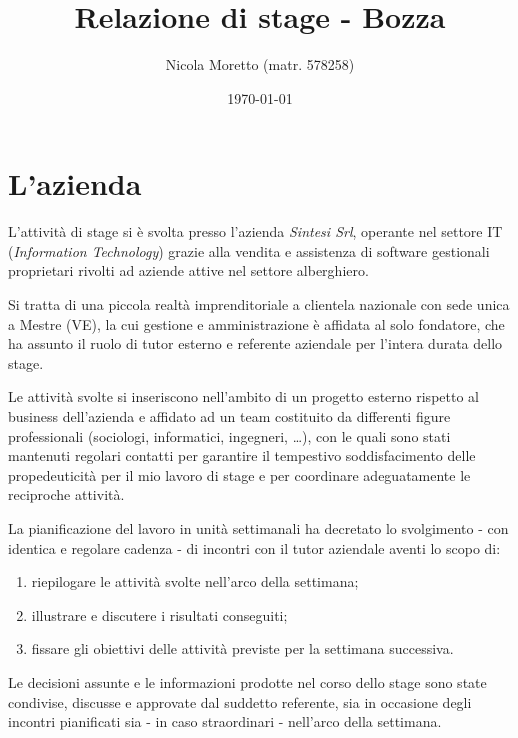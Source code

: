 \documentclass[12pt,a4paper,headsepline,hidelinks]{scrreprt} %
\def \azienda{\textit{Sintesi Srl}}
\begin{document}
    \title{Relazione di stage - Bozza}
	\subject{Analisi e progettazione di un'interfaccia grafica per la consultazione dei contenuti informativi in una piattaforma web tematica}
    \author{Nicola Moretto (matr. 578258)}
    \date{\today}

    \maketitle

	\tableofcontents

	\listoffigures
	\begingroup
	\let\clearpage\relax
	\listoftables
	\endgroup

	\chapter{L'azienda}
	L'attività di stage si è svolta presso l'azienda \azienda{}, operante nel settore IT (\textit{Information Technology}) grazie alla vendita e assistenza di software gestionali proprietari rivolti ad aziende attive nel settore alberghiero.

	Si tratta di una piccola realtà imprenditoriale a clientela nazionale con sede unica a Mestre (VE), la cui gestione e amministrazione è affidata al solo fondatore, che ha assunto il ruolo di tutor esterno e referente aziendale per l'intera durata dello stage.

	Le attività svolte si inseriscono nell'ambito di un progetto esterno rispetto al business dell'azienda e affidato ad un team costituito da differenti figure professionali (sociologi, informatici, ingegneri, \ldots), con le quali sono stati mantenuti regolari contatti per garantire il tempestivo soddisfacimento delle propedeuticità per il mio lavoro di stage e per coordinare adeguatamente le reciproche attività.

	La pianificazione del lavoro in unità settimanali ha decretato lo svolgimento - con identica e regolare cadenza - di incontri con il tutor aziendale aventi lo scopo di:
	\begin{enumerate}
	\item riepilogare le attività svolte nell'arco della settimana;
	\item illustrare e discutere i risultati conseguiti;
	\item fissare gli obiettivi delle attività previste per la settimana successiva.
	\end{enumerate}   

	Le decisioni assunte e le informazioni prodotte nel corso dello stage sono state condivise, discusse e approvate dal suddetto referente, sia in occasione degli incontri pianificati sia - in caso straordinari - nell'arco della settimana.
\end{document}
